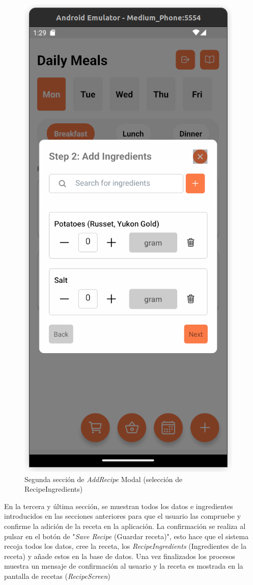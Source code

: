 \documentclass[twoside, openright, 11pt]{report}
\begin{document}
					\begin{figure}[H]
						\centering
						\includegraphics[]{imagenes/AddRecipeModalSegundaParte}
						\caption{Segunda sección de \textit{AddRecipe} Modal (selección de RecipeIngredients)}
						\label{fig:AddRecipeModalSegundaParte}
					\end{figure}
							
					En la tercera y última sección, se muestran todos los datos e ingredientes introducidos en las secciones anteriores para que el usuario las compruebe y confirme la adición de la receta en la aplicación. La confirmación se realiza al pulsar en el botón de "\textit{Save Recipe} (Guardar receta)", esto hace que el sistema recoja todos los datos, cree la receta, los \textit{RecipeIngredients} (Ingredientes de la receta) y añade estos en la base de datos. Una vez finalizados los procesos muestra un mensaje de confirmación al usuario y la receta es mostrada en la pantalla de recetas (\textit{RecipeScreen})
							
\end{document}
